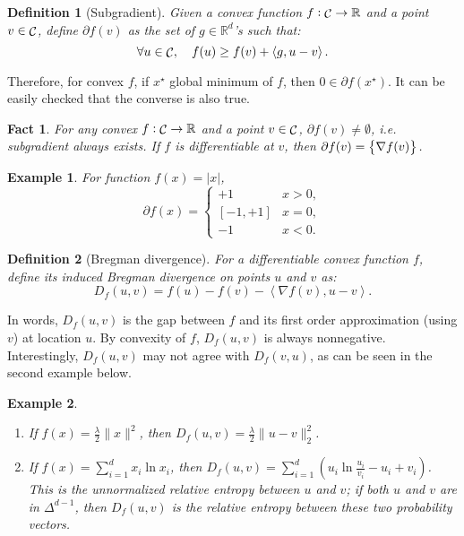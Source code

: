 \documentclass{article}
\newtheorem{example}{Example}
\newtheorem{definition}{Definition}
\newtheorem{fact}{Fact}
\DeclareMathOperator*{\Ccal}{{\cal C}}
\newcommand{\RR}{\mathbb{R}} %
\newcommand{\inner}[2]{\left\langle #1,#2 \right\rangle}
\begin{document}
\begin{definition}[Subgradient]
Given a convex function $f: \Ccal \to \RR$ and a point $v \in \Ccal$, define $\partial f(v)$ as the set of $g \in \RR^d$'s such that:
\[ \forall u \in \Ccal, \quad f(u) \geq f(v) + \inner{g}{u - v}. \]
\end{definition}

Therefore, for convex $f$, if $x^\star$ global minimum of $f$, then $0 \in \partial f(x^\star)$. It can be easily checked that the converse is also true. %

\begin{fact}
For any convex $f: \Ccal \to \RR$ and a point $v \in \Ccal$, $\partial f(v) \neq \emptyset$, i.e. subgradient always exists. If $f$ is differentiable at $v$, then $\partial f(v) = \cbr{\nabla f(v)}$.
\end{fact}

\begin{example}
For function $f(x) = |x|$,
\[ \partial f(x) = \begin{cases} +1 & x > 0, \\ [-1,+1] & x = 0, \\ -1 & x < 0. \end{cases}\]
\end{example}

\begin{definition}[Bregman divergence]
For a differentiable convex function $f$, define its induced Bregman divergence on points $u$ and $v$ as:
\[ D_f(u, v) = f(u) - f(v) - \inner{\nabla f(v)}{u - v}. \]
\end{definition}
In words, $D_f(u, v)$ is the gap between $f$ and its first order approximation (using $v$) at location $u$. By convexity of $f$, $D_f(u, v)$ is always nonnegative. Interestingly, $D_f(u, v)$ may not agree with $D_f(v, u)$, as can be seen in the second example below.

\begin{example}
  \begin{enumerate}
  \item If $f(x) = \frac{\lambda}{2}\|x\|^2$, then $D_f(u, v) = \frac{\lambda}{2}\|u - v\|_2^2$.
  \item If $f(x) = \sum_{i=1}^d x_i \ln x_i$, then $D_f(u, v)= \sum_{i=1}^d (u_i \ln\frac{u_i}{v_i} - u_i + v_i)$. This is the {\em unnormalized relative entropy} between $u$ and $v$; if both $u$ and $v$ are in $\Delta^{d-1}$, then $D_f(u, v)$ is the {\em relative entropy} between these two probability vectors.
\end{enumerate}
\end{example}
\end{document}
